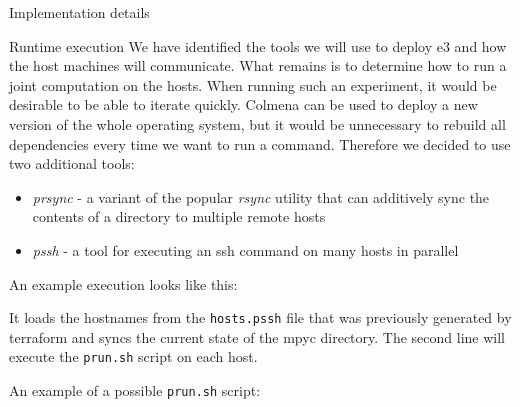 \begin{frame}[fragile]{Implementation details}
\begin{block}{Runtime execution}
\protect\hypertarget{runtime-execution}{}
We have identified the tools we will use to deploy \gls{e3} and how the
host machines will communicate. What remains is to determine how to run
a joint computation on the hosts. When running such an experiment, it
would be desirable to be able to iterate quickly. Colmena can be used to
deploy a new version of the whole operating system, but it would be
unnecessary to rebuild all dependencies every time we want to run a
command. Therefore we decided to use two additional tools:

\begin{itemize}
\tightlist
\item
  \emph{prsync} - a variant of the popular \emph{rsync} utility that can
  additively sync the contents of a directory to multiple remote hosts
\item
  \emph{pssh} - a tool for executing an ssh command on many hosts in
  parallel
\end{itemize}

An example execution looks like this:

\begin{Shaded}
\begin{Highlighting}[]
  
   
\end{Highlighting}
\end{Shaded}

It loads the hostnames from the \texttt{hosts.pssh} file that was
previously generated by terraform and syncs the current state of the
mpyc directory. The second line will execute the \texttt{prun.sh} script
on each host.

An example of a possible \texttt{prun.sh} script:

\newpage

\begin{Shaded}
\begin{Highlighting}[]

\OperatorTok{=}
\OperatorTok{=}
\OperatorTok{=}

\OperatorTok{=}
\OperatorTok{=}


\end{Highlighting}
\end{Shaded}
\end{block}
\end{frame}
